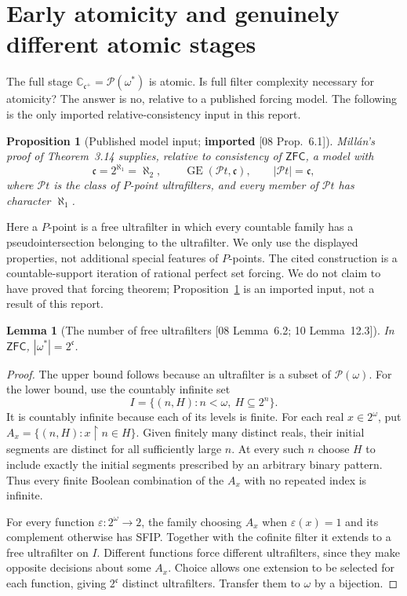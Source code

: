 \documentclass[11pt,letterpaper]{article}
\newtheorem{lemma}[theorem]{Lemma}
\newtheorem{proposition}[theorem]{Proposition}
\theoremstyle{definition}
\theoremstyle{remark}
\newcommand{\om}{\omega}
\newcommand{\C}{\mathbb C}
\newcommand{\pow}{\mathcal P}
\newcommand{\cc}{\mathfrak c}
\newcommand{\GE}{\operatorname{GE}}
\newcommand{\res}{\mathbin{\upharpoonright}}
\newcommand{\ZFC}{\mathsf{ZFC}}
\newcommand{\src}[1]{\textup{[#1]}}
\begin{document}
\section{Early atomicity and genuinely different atomic stages}
\label{fbc:sec:early-atomicity}

The full stage $\C_{\cc^+}=\pow(\om^*)$ is atomic. Is full filter
complexity necessary for atomicity? The answer is no, relative to a
published forcing model. The following is the only imported
relative-consistency input in this report.

\begin{proposition}[Published model input; \textbf{imported} \src{08 Prop.~6.1}]
\label{fbc:prop:model-input}
Mill\'an's proof of Theorem~3.14 \cite[pp.~34--35]{Millan} supplies,
relative to consistency of $\ZFC$, a model with
\[
 \cc=2^{\aleph_1}=\aleph_2,
 \qquad \GE(\mathcal P\!t,\cc),
 \qquad |\mathcal P\!t|=\cc,
\]
where $\mathcal P\!t$ is the class of $P$-point ultrafilters, and every
member of $\mathcal P\!t$ has character $\aleph_1$.
\end{proposition}

Here a $P$-point is a free ultrafilter in which every countable family
has a pseudointersection belonging to the ultrafilter. We only use
the displayed properties, not additional special features of $P$-points.
The cited construction is a countable-support iteration of rational
perfect set forcing. We do not claim to have proved that forcing theorem;
Proposition~\ref{fbc:prop:model-input} is an imported input, not a result
of this report.

\begin{lemma}[The number of free ultrafilters \src{08 Lemma~6.2; 10 Lemma~12.3}]
\label{fbc:lem:ultra-number}
In $\ZFC$, $|\om^*|=2^\cc$.
\end{lemma}
\begin{proof}
The upper bound follows because an ultrafilter is a subset of
$\pow(\om)$. For the lower bound, use the countably infinite set
\[
 I=\{(n,H):n<\om,\ H\subseteq2^n\}.
\]
It is countably infinite because each of its levels is finite. For each
real $x\in2^\om$, put $A_x=\{(n,H):x\res n\in H\}$. Given finitely many
distinct reals, their initial segments are distinct for all sufficiently
large $n$. At every such $n$ choose $H$ to include exactly the initial
segments prescribed by an arbitrary binary pattern. Thus every finite
Boolean combination of the $A_x$ with no repeated index is infinite.

For every function $\varepsilon:2^\om\to2$, the family choosing
$A_x$ when $\varepsilon(x)=1$ and its complement otherwise has
SFIP. Together with the cofinite filter it extends to a free
ultrafilter on $I$. Different functions force different ultrafilters,
since they make opposite decisions about some $A_x$.
Choice allows one extension to be selected for each function, giving
$2^\cc$ distinct ultrafilters. Transfer them to $\om$ by a bijection.
\end{proof}
\end{document}
